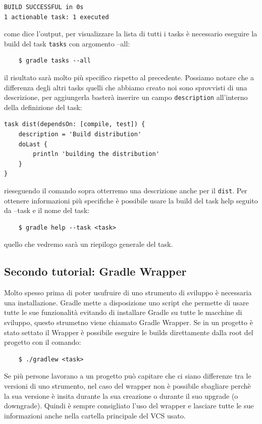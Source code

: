 \documentclass{article}
\begin{document}
\begin{flushleft}
\begin{verbatim}
BUILD SUCCESSFUL in 0s
1 actionable task: 1 executed \end{verbatim}
come dice l'output, per visualizzare la lista di tutti i tasks è necessario eseguire la build del task \texttt{tasks} con argomento --all:
\begin{verbatim}
    $ gradle tasks --all \end{verbatim}
    il risultato sarà molto più specifico rispetto al precedente. Possiamo notare che a differenza degli altri tasks quelli che abbiamo creato noi sono sprovvisti di una descrizione, per aggiungerla basterà inserire un campo \texttt{description} all'interno della definizione del task:
    \begin{verbatim}
task dist(dependsOn: [compile, test]) {
    description = 'Build distribution'
    doLast {
        println 'building the distribution'
    }
} \end{verbatim}
rieseguendo il comando sopra otterremo una descrizione anche per il \texttt{dist}. Per ottenere informazioni più specifiche è possibile usare la build del task help seguito da --task e il nome del task:
\begin{verbatim}
    $ gradle help --task <task> \end{verbatim}
quello che vedremo sarà un riepilogo generale del task.

\subsection{Secondo tutorial: Gradle Wrapper}
Molto spesso prima di poter usufruire di uno strumento di sviluppo è necessaria una installazione. Gradle mette a disposizione uno script che permette di usare tutte le sue funzionalità evitando di installare Gradle su tutte le macchine di sviluppo, questo strumetno viene chiamato Gradle Wrapper. Se in un progetto è stato settato il Wrapper è possibile eseguire le builds direttamente dalla root del progetto con il comando:
\begin{verbatim}
    $ ./gradlew <task> \end{verbatim}
Se più persone lavorano a un progetto può capitare che ci siano differenze tra le versioni di uno strumento, nel caso del wrapper non è possibile sbagliare perchè la sua versione è insita durante la sua creazione o durante il suo upgrade (o downgrade). Quindi è sempre consigliato l'uso del wrapper e lasciare tutte le sue informazioni anche nella cartella principale del VCS usato.


\end{flushleft}
\end{document}

